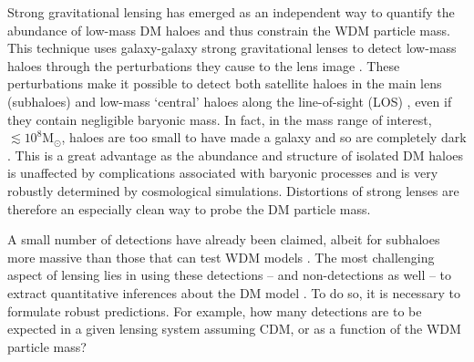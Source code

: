 \documentclass[a4paper, fleqn, usenatbib, useAMS]{mnras}
\begin{document}
Strong gravitational lensing has emerged as an independent way to quantify the abundance 
of low-mass DM haloes and thus constrain the WDM particle mass. 
This technique uses galaxy-galaxy strong gravitational lenses \citep[e.g.,][]{Bolton2005, Shu2016} 
to detect low-mass haloes through the perturbations they cause to the
lens image 
\citep[see also the alternative approach based on flux ratio anomalies of lensed quasars, e.g.,][]{Xu2015, Gilman2017, Gilman2019, Gilman2020, Harvey2020}.  
These perturbations make it possible to detect both satellite haloes
in the main lens (subhaloes) and low-mass `central' haloes 
along the line-of-sight (LOS) \citep{Li2016, Despali2018}, even if
they contain negligible baryonic mass. In fact, in the mass range of
interest, $\lesssim 10^8$M$_\odot$, haloes are too small to have made
a galaxy and so are completely dark \citep{Benitez-Llambay2020}. This is a great advantage as the 
abundance and structure of isolated DM haloes is unaffected by
complications associated with baryonic processes and
is very robustly determined by cosmological simulations. Distortions
of strong lenses are therefore 
an especially clean way to probe the DM particle mass. %
 
A small number of detections have already been claimed, albeit for
subhaloes more massive than those that can test WDM models \citep{Vegetti2010, Vegetti2012, Hezaveh2016}. The most challenging aspect of lensing lies in using these detections -- and 
non-detections as well -- to extract quantitative inferences about the DM model \citep[e.g.][]{Vegetti2014, Vegetti2018, Ritondale2019}. 
To do so, it is necessary to formulate robust predictions. For
example, how many detections are to be expected in a
given lensing system assuming CDM, or as a function of the WDM particle mass? 
\end{document}
